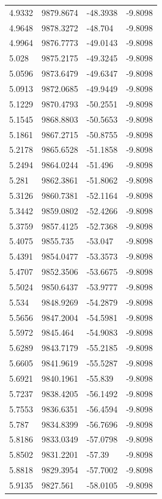 \begin{table}[H]
\begin{tabular}{llll}
4.9332 & 9879.8674 & -48.3938 & -9.8098 \\
4.9648 & 9878.3272 & -48.704 & -9.8098 \\
4.9964 & 9876.7773 & -49.0143 & -9.8098 \\
5.028 & 9875.2175 & -49.3245 & -9.8098 \\
5.0596 & 9873.6479 & -49.6347 & -9.8098 \\
5.0913 & 9872.0685 & -49.9449 & -9.8098 \\
5.1229 & 9870.4793 & -50.2551 & -9.8098 \\
5.1545 & 9868.8803 & -50.5653 & -9.8098 \\
5.1861 & 9867.2715 & -50.8755 & -9.8098 \\
5.2178 & 9865.6528 & -51.1858 & -9.8098 \\
5.2494 & 9864.0244 & -51.496 & -9.8098 \\
5.281 & 9862.3861 & -51.8062 & -9.8098 \\
5.3126 & 9860.7381 & -52.1164 & -9.8098 \\
5.3442 & 9859.0802 & -52.4266 & -9.8098 \\
5.3759 & 9857.4125 & -52.7368 & -9.8098 \\
5.4075 & 9855.735 & -53.047 & -9.8098 \\
5.4391 & 9854.0477 & -53.3573 & -9.8098 \\
5.4707 & 9852.3506 & -53.6675 & -9.8098 \\
5.5024 & 9850.6437 & -53.9777 & -9.8098 \\
5.534 & 9848.9269 & -54.2879 & -9.8098 \\
5.5656 & 9847.2004 & -54.5981 & -9.8098 \\
5.5972 & 9845.464 & -54.9083 & -9.8098 \\
5.6289 & 9843.7179 & -55.2185 & -9.8098 \\
5.6605 & 9841.9619 & -55.5287 & -9.8098 \\
5.6921 & 9840.1961 & -55.839 & -9.8098 \\
5.7237 & 9838.4205 & -56.1492 & -9.8098 \\
5.7553 & 9836.6351 & -56.4594 & -9.8098 \\
5.787 & 9834.8399 & -56.7696 & -9.8098 \\
5.8186 & 9833.0349 & -57.0798 & -9.8098 \\
5.8502 & 9831.2201 & -57.39 & -9.8098 \\
5.8818 & 9829.3954 & -57.7002 & -9.8098 \\
5.9135 & 9827.561 & -58.0105 & -9.8098 \\

\end{tabular}
\end{table}

